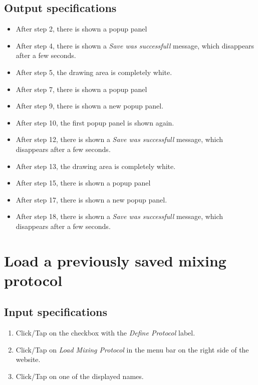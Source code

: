 \subsection*{Output specifications}
\begin{itemize}
\item After step 2, there is shown a popup panel
\item After step 4, there is shown a \emph{Save was successfull} message, which disappears after a few seconds.
\item After step 5, the drawing area is completely white.
\item After step 7, there is shown a popup panel
\item After step 9, there is shown a new popup panel.
\item After step 10, the first popup panel is shown again.
\item After step 12, there is shown a \emph{Save was successfull} message, which disappears after a few seconds.
\item After step 13, the drawing area is completely white.
\item After step 15, there is shown a popup panel
\item After step 17, there is shown a new popup panel.
\item After step 18, there is shown a \emph{Save was successfull} message, which disappears after a few seconds.
\end{itemize}

\section{Load a previously saved mixing protocol}

\subsection*{Input specifications}
\begin{enumerate}
\item Click/Tap on the checkbox with the \emph{Define Protocol} label.
\item Click/Tap on \emph{Load Mixing Protocol} in the menu bar on the right side of the website.
\item Click/Tap on one of the displayed names.
\end{enumerate}

